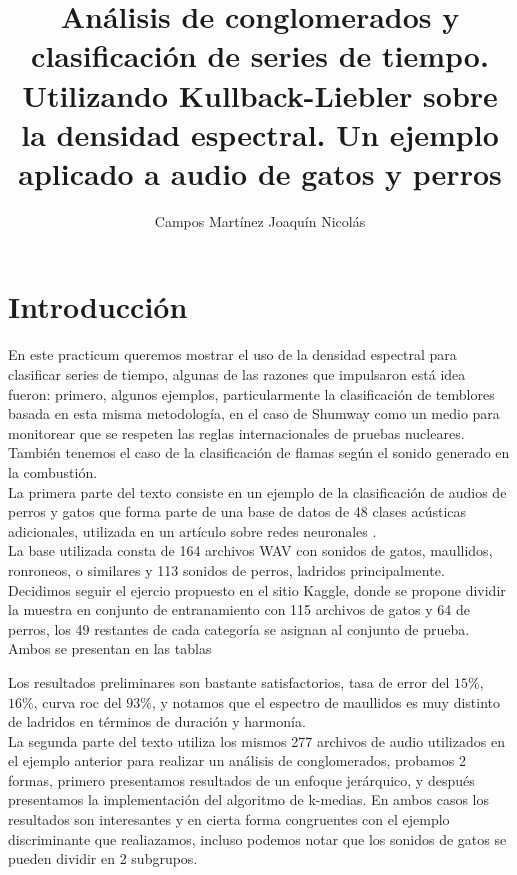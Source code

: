 \documentclass[twocolumn,10pt]{asme2ej}
\title{An\'alisis de conglomerados y clasificaci\'on de series de tiempo. Utilizando Kullback-Liebler sobre la densidad espectral. Un ejemplo aplicado a audio de gatos y perros}
\author{Campos Mart\'inez Joaqu\'in Nicol\'as
    \affiliation{
	Alumno de Actuar\'ia\\
	Facultad de Ciencias Actuariales\\
	Universidad An\'ahuac Campus Norte\\
    }	
}
\begin{document}
\maketitle 
\section*{Introducci\'on} %
\label{sec:introduccion}
En este practicum queremos mostrar el uso de la densidad espectral para clasificar series de tiempo, algunas de las razones que impulsaron está idea fueron: primero, algunos ejemplos, particularmente la clasificación de temblores basada en esta misma metodología\cite{SUBJ_SP1}\cite{SUBJ_SP2}, en el caso de Shumway como un medio para monitorear que se respeten las reglas internacionales de pruebas nucleares. Tambi\'en tenemos el caso de la clasificaci\'on de flamas seg\'un el sonido generado en la combusti\'on.\cite{SUBJ_SP3}\\

La primera parte del texto consiste en un ejemplo de la clasificaci\'on de audios de perros y gatos que forma parte de una base de datos de 48 clases ac\'usticas adicionales, utilizada en un art\'iculo sobre redes neuronales \cite{DATOS}.\\

La base utilizada consta de 164 archivos WAV con sonidos de gatos, maullidos, ronroneos, o similares y 113 sonidos de perros, ladridos principalmente. Decidimos seguir el ejercio propuesto en el sitio Kaggle\cite{DATOS2}, donde se propone dividir la muestra en conjunto de entranamiento con 115 archivos de gatos y 64 de perros, los 49 restantes de cada categor\'ia se asignan al conjunto de prueba. Ambos se presentan en las tablas 

Los resultados preliminares son bastante satisfactorios, tasa de error del $15\%$, $16\%$, curva roc del $93\%$, y notamos que el espectro de maullidos es muy distinto de ladridos en t\'erminos de duraci\'on y harmon\'ia.\\

La segunda parte del texto utiliza los mismos 277 archivos de audio utilizados en el ejemplo anterior para realizar un an\'alisis de conglomerados, probamos 2 formas, primero presentamos resultados de un enfoque jer\'arquico, y despu\'es presentamos la implementaci\'on del algoritmo de k-medias. En ambos casos los resultados son interesantes y en cierta forma congruentes con el ejemplo discriminante que realiazamos, incluso podemos notar que los sonidos de gatos se pueden dividir en 2 subgrupos.\\
\end{document}
